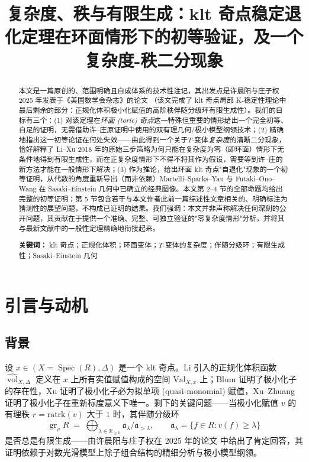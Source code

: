\documentclass[11pt,a4paper]{article}
\title{\textbf{复杂度、秩与有限生成：klt 奇点稳定退化定理在环面情形下的初等验证，及一个复杂度-秩二分现象}}
\author{}
\date{}
\theoremstyle{definition}
\theoremstyle{remark}
\DeclareMathOperator{\vol}{vol}
\DeclareMathOperator{\Spec}{Spec}
\DeclareMathOperator{\gr}{gr}
\newcommand{\R}{\mathbb{R}}
\begin{document}
\maketitle
\vspace{-1.5em}

\begin{abstract}
本文是一篇原创的、范围明确且自成体系的技术性注记，其出发点是许晨阳与庄子权 2025 年发表于《美国数学会杂志》的论文 \cite{XZ2025}（该文完成了 klt 奇点局部 K-稳定性理论中最后剩余的部分：正规化体积极小化赋值的高阶秩伴随分级环有限生成性）。我们的目标有三个：(1) 对该定理在\emph{环面 (toric) 奇点}这一特殊但重要的情形给出一个完全初等、自足的证明，无需借助许--庄原证明中使用的双有理几何/极小模型纲领技术；(2) 精确地指出这一初等论证在何处失效——由此得到一个关于$T$-变体\emph{复杂度}的清晰二分现象，恰好解释了 Li--Xu \cite{LX2018} 2018 年的原始三步策略为何只能在复杂度为零（即环面）情形下无条件地得到有限生成性，而在正复杂度情形下不得不将其作为假设，需要等到许--庄的新方法才能在一般情形下解决；(3) 作为推论，给出环面 klt 奇点"自退化"现象的一个初等证明，从代数的角度重新导出（而非依赖）Martelli--Sparks--Yau \cite{MSY2008} 与 Futaki--Ono--Wang \cite{FOW2009} 在 Sasaki--Einstein 几何中已确立的经典图像。本文第 2--4 节的全部命题均给出完整的初等证明；第 5 节包含若干与本文作者此前一篇综述性文章相关的、明确标注为猜测性的展望问题，不构成已证明的结果。我们强调：本文并非声称解决任何深刻的公开问题，其贡献在于提供一个准确、完整、可独立验证的"零复杂度情形"分析，并将其与最新文献中的一般性定理精确地衔接起来。

\medskip
\noindent\textbf{关键词：} klt 奇点；正规化体积；环面变体；$T$-变体的复杂度；伴随分级环；有限生成性；Sasaki--Einstein 几何
\end{abstract}

\tableofcontents

\section{引言与动机}

\subsection{背景}

设 $x\in (X=\Spec(R),\Delta)$ 是一个 klt 奇点。Li \cite{Li2018Duke} 引入的正规化体积函数 $\widehat{\vol}_{X,\Delta}$ 定义在 $x$ 上所有实值赋值构成的空间 $\mathrm{Val}_{X,x}$ 上；Blum \cite{Blum2018} 证明了极小化子的存在性，Xu \cite{Xu2020} 证明了极小化子必为拟单项 (quasi-monomial) 赋值，Xu--Zhuang \cite{XZ2021} 证明了极小化子在重新标度意义下唯一。剩下的关键问题——当极小化赋值 $v$ 的有理秩 $r=\mathrm{ratrk}(v)$ 大于 $1$ 时，其伴随分级环
\[
\gr_v R \;=\; \bigoplus_{\lambda\in\R_{\ge0}} \mathfrak a_\lambda/\mathfrak a_{>\lambda}, \qquad \mathfrak a_\lambda=\{f\in R: v(f)\ge \lambda\}
\]
是否总是有限生成——由许晨阳与庄子权在 2025 年的论文 \cite{XZ2025} 中给出了肯定回答，其证明依赖于对数光滑模型上除子组合结构的精细分析与极小模型纲领。
\end{document}
